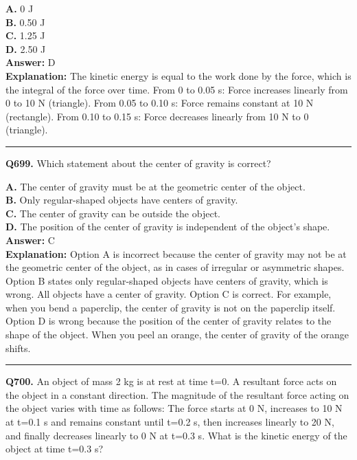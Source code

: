 \documentclass[12pt]{article}
\begin{document}
\textbf{A.} 0 J \\
\textbf{B.} 0.50 J \\
\textbf{C.} 1.25 J \\
\textbf{D.} 2.50 J \\

\textbf{Answer:} D \\
\textbf{Explanation:} The kinetic energy is equal to the work done by the force, which is the integral of the
force over time. From 0 to 0.05 s: Force increases linearly from 0 to 10 N (triangle).
From 0.05 to 0.10 s: Force remains constant at 10 N (rectangle).
From 0.10 to 0.15 s: Force decreases linearly from 10 N to 0 (triangle).

\hrule
\vspace{1em}


\noindent
\textbf{Q699.} Which statement about the center of gravity is correct?



\textbf{A.} The center of gravity must be at the geometric center of the object. \\
\textbf{B.} Only regular-shaped objects have centers of gravity. \\
\textbf{C.} The center of gravity can be outside the object. \\
\textbf{D.} The position of the center of gravity is independent of the object's shape. \\

\textbf{Answer:} C \\
\textbf{Explanation:} Option A is incorrect because the center of gravity may not be at the geometric center of the object, as in cases of irregular or asymmetric shapes.
Option B states only regular-shaped objects have centers of gravity, which is wrong. All objects have a center of gravity.
Option C is correct. For example, when you bend a paperclip, the center of gravity is not on the paperclip itself.
Option D is wrong because the position of the center of gravity relates to the shape of the object. When you peel an orange, the center of gravity of the orange shifts.

\hrule
\vspace{1em}


\noindent
\textbf{Q700.} An object of mass 2 kg is at rest at time t=0. A resultant force acts on the object in a constant direction. The magnitude of the resultant force acting on the object varies with time as follows:
The force starts at 0 N, increases to 10 N at t=0.1 s and remains constant until t=0.2 s, then increases linearly to 20 N, and finally decreases linearly to 0 N at t=0.3 s.
What is the kinetic energy of the object at time t=0.3 s?
\end{document}
